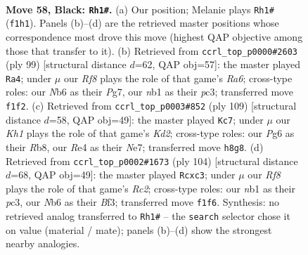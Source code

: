 \documentclass[11pt]{article}
\begin{document}
\clearpage

\begin{figure}[p]\centering
\begin{subfigure}{0.46\textwidth}\centering
\resizebox{\linewidth}{!}{%
\newchessgame
\chessboard[
  setfen={7k/5p1p/1n4p1/p3p1P1/P3r2P/1P4RK/6P1/RN3r2 b - - 1 58},
  showmover=false,
  pgfstyle=straightmove, color=movearrow, markmove={f1-h1}
]}
\caption{}
\end{subfigure}\hfill
\begin{subfigure}{0.46\textwidth}\centering
\resizebox{\linewidth}{!}{%
\newchessgame
\chessboard[
  setfen={8/6p1/6kp/ppr5/7P/r1PR1PP1/P1RK4/8 b - - 6 50},
  showmover=false,
  pgfstyle=straightmove, color=movearrow, markmove={a3-a4}
]}
\caption{}
\end{subfigure}
\\[4pt]
\begin{subfigure}{0.46\textwidth}\centering
\resizebox{\linewidth}{!}{%
\newchessgame
\chessboard[
  setfen={1r6/r2kn3/P2p1pp1/2pP4/2N2P1p/2KR3P/1P4P1/R7 b - - 17 55},
  showmover=false,
  pgfstyle=straightmove, color=movearrow, markmove={d7-c7}
]}
\caption{}
\end{subfigure}\hfill
\begin{subfigure}{0.46\textwidth}\centering
\resizebox{\linewidth}{!}{%
\newchessgame
\chessboard[
  setfen={1br5/1p1rkp2/1P4p1/5p1p/7P/R1p1PBP1/2R2P2/5K2 w - - 2 53},
  showmover=false,
  pgfstyle=straightmove, color=movearrow, markmove={c2-c3}
]}
\caption{}
\end{subfigure}
\caption{\textbf{Move 58, Black: \texttt{Rh1\#}.} (a) Our position; Melanie plays \texttt{Rh1\#} (\texttt{f1h1}). Panels (b)--(d) are the retrieved master positions whose correspondence most drove this move (highest QAP objective among those that transfer to it). (b) Retrieved from \texttt{ccrl\_top\_p0000\#2603} (ply 99) [structural distance $d$=62, QAP obj=57]: the master played \texttt{Ra4}; under $\mu$ our \emph{Rf8} plays the role of that game's \emph{Ra6}; cross-type roles: our \emph{N}b6 as their \emph{P}g7, our \emph{n}b1 as their \emph{p}c3; transferred move \texttt{f1f2}. (c) Retrieved from \texttt{ccrl\_top\_p0003\#852} (ply 109) [structural distance $d$=58, QAP obj=49]: the master played \texttt{Kc7}; under $\mu$ our \emph{Kh1} plays the role of that game's \emph{Kd2}; cross-type roles: our \emph{P}g6 as their \emph{R}b8, our \emph{R}e4 as their \emph{N}e7; transferred move \texttt{h8g8}. (d) Retrieved from \texttt{ccrl\_top\_p0002\#1673} (ply 104) [structural distance $d$=68, QAP obj=49]: the master played \texttt{Rcxc3}; under $\mu$ our \emph{Rf8} plays the role of that game's \emph{Rc2}; cross-type roles: our \emph{n}b1 as their \emph{p}c3, our \emph{N}b6 as their \emph{B}f3; transferred move \texttt{f1f6}. Synthesis: no retrieved analog transferred to \texttt{Rh1\#} -- the \texttt{search} selector chose it on value (material / mate); panels (b)--(d) show the strongest nearby analogies.}
\label{fig:thought-m115}
\end{figure}
\end{document}
